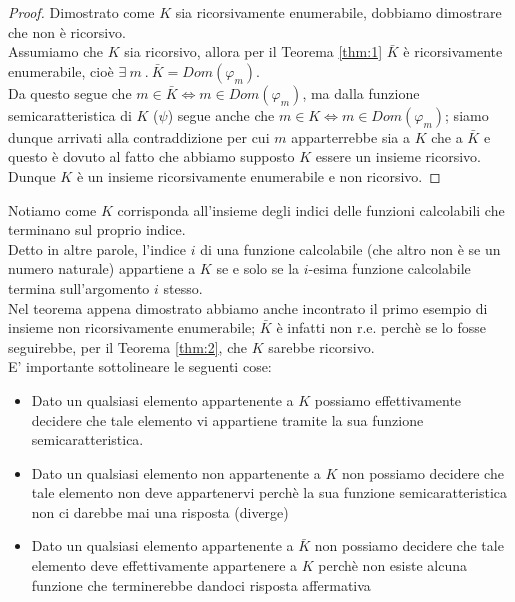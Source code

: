 \begin{proof}
  Dimostrato come $K$ sia ricorsivamente enumerabile, dobbiamo dimostrare che non è ricorsivo.\\

  Assumiamo che $K$ sia ricorsivo, allora per il Teorema \ref{thm:1} $\bar{K}$ è ricorsivamente enumerabile, cioè 
  $\exists\ m\ .\ \bar{K} = Dom(\varphi_{m})$.\\
  Da questo segue che $m \in \bar{K} \iff m \in Dom(\varphi_{m})$, ma dalla funzione semicaratteristica di $K$ ($\psi$) segue anche che
  $m \in K \iff m \in Dom(\varphi_{m})$; siamo dunque arrivati alla contraddizione per cui $m$ apparterrebbe sia a $K$ che a $\bar{K}$ e
  questo è dovuto al fatto che abbiamo supposto $K$ essere un insieme ricorsivo.\\

  Dunque $K$ è un insieme ricorsivamente enumerabile e non ricorsivo.
\end{proof}

Notiamo come $K$ corrisponda all'insieme degli indici delle funzioni calcolabili che terminano sul proprio indice.\\
Detto in altre parole, l'indice $i$ di una funzione calcolabile (che altro non è se un numero naturale)
appartiene a $K$ se e solo se la $i$-esima funzione calcolabile termina sull'argomento $i$ stesso.\\

Nel teorema appena dimostrato abbiamo anche incontrato  il primo esempio di insieme non ricorsivamente enumerabile; $\bar{K}$ è infatti
non r.e. perchè se lo fosse seguirebbe, per il Teorema \ref{thm:2}, che $K$ sarebbe ricorsivo.\\

E' importante sottolineare le seguenti cose:
\begin{itemize}
  \item Dato un qualsiasi elemento appartenente a $K$ possiamo effettivamente decidere che tale elemento vi appartiene tramite la sua funzione semicaratteristica.
  \item Dato un qualsiasi elemento non appartenente a $K$ non possiamo decidere che tale elemento non deve appartenervi perchè la sua funzione semicaratteristica
    non ci darebbe mai una risposta (diverge)
  \item Dato un qualsiasi elemento appartenente a $\bar{K}$ non possiamo decidere che tale elemento deve effettivamente appartenere a $K$ perchè non esiste alcuna
    funzione che terminerebbe dandoci risposta affermativa
\end{itemize}

